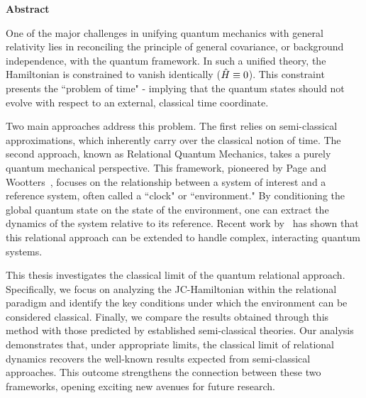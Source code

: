 \begin{center}
    {\Large\bfseries\sffamily Abstract}
\end{center}

One of the major challenges in unifying quantum mechanics with general relativity lies in reconciling the principle of general covariance, or background independence, with the quantum framework. In such a unified theory, the Hamiltonian is constrained to vanish identically ($\Hat{H} \equiv 0$). This constraint presents the ``problem of time" -  implying that the quantum states should not evolve with respect to an external, classical time coordinate. 

Two main approaches address this problem. The first relies on semi-classical approximations, which inherently carry over the classical notion of time. The second approach, known as Relational Quantum Mechanics, takes a purely quantum mechanical perspective. This framework, pioneered by Page and Wootters~\cite{page1983evolution}, focuses on the relationship between a system of interest and a reference system, often called a ``clock" or ``environment." By conditioning the global quantum state on the state of the environment, one can extract the dynamics of the system relative to its reference. Recent work by~\cite{Gemsheim:2023izg} has shown that this relational approach can be extended to handle complex, interacting quantum systems.

This thesis investigates the classical limit of the quantum relational approach.  Specifically, we focus on analyzing the JC-Hamiltonian within the relational paradigm and identify the key conditions under which the environment can be considered classical. Finally, we compare the results obtained through this method with those predicted by established semi-classical theories. Our analysis demonstrates that, under appropriate limits, the classical limit of relational dynamics recovers the well-known results expected from semi-classical approaches. This outcome strengthens the connection between these two frameworks, opening exciting new avenues for future research.
\newpage
